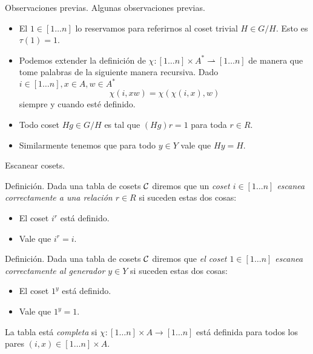 \documentclass[aspectratio=169, 9pt]{beamer}
\newcommand{\In}{[1 \dots n]}
\newcommand{\Co}{{\cal{C}}}
\begin{document}
\begin{frame}[fragile]{Observaciones previas.}
	Algunas observaciones previas.
	\begin{itemize}
		\item El $1 \in \In$ lo reservamos para referirnos al coset trivial $H \in G/H$.
		Esto es $\tau (1) = 1$.
		
		\pause
		\item  Podemos extender la definición de $\chi: \In \times A^{*} \rightharpoonup \In$ de manera que tome palabras de la siguiente manera recursiva. 
		Dado $i \in \In, x \in A, w \in A^{*}$
		\[
		\chi(i,xw) = \chi (\chi(i,x), w)
		\]
		siempre y cuando esté definido.
		
		\pause
		
		\item Todo coset $Hg \in G/H$ es tal que $(Hg)r = 1$ para toda $r \in R$.
		
		\pause
		
		\item Similarmente tenemos que para todo $y \in Y$ vale que $Hy = H$.
	\end{itemize}
\end{frame}
\begin{frame}[fragile]{Escanear cosets.} 
	\begin{alertblock}{Definición.}
		Dada una tabla de cosets $\Co$ diremos que un \emph{coset $i \in \In$ escanea correctamente a una relación $r \in R$} si suceden estas dos cosas:
		\begin{itemize}
			\item El coset $i^r$ está definido.
			\item Vale que $i^r = i$.
		\end{itemize}
	\end{alertblock}
	
	\pause
	
	\begin{alertblock}{Definición.}
		Dada una tabla de cosets $\Co$ diremos que \emph{el coset $1 \in \In$ escanea correctamente al generador $y \in Y$} si suceden estas dos cosas:
		\begin{itemize}
			\item El coset $1^y$ está definido.
			\item Vale que $1^y = 1$.
		\end{itemize}
	\end{alertblock}
	
	

	\pause
	\medskip
	
	
	
	La tabla está \emph{completa} si $\chi:\In \times A \to \In$ está definida para todos los pares $(i, x) \in \In \times A$. 
\end{frame}
\end{document}
